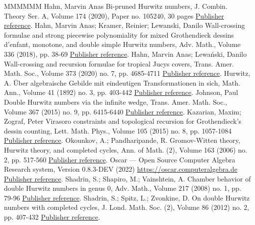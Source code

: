 \begin{thebibliography}{MMMMMM}
 Hahn, Marvin Anas Bi-pruned Hurwitz numbers, J. Combin. Theory Ser. A, Volume 174 (2020), Paper no. 105240, 30 pages \href{https://alco.centre-mersenne.org/articles/10.5802/alco.368/#hahn2020bi}{Publisher reference}.
 Hahn, Marvin Anas; Kramer, Reinier; Lewanski, Danilo Wall-crossing formulae and strong piecewise polynomiality for mixed Grothendieck dessins d’enfant, monotone, and double simple Hurwitz numbers, Adv. Math., Volume 336 (2018), pp. 38-69 \href{https://alco.centre-mersenne.org/articles/10.5802/alco.368/#hahn2018wall}{Publisher reference}.
 Hahn, Marvin Anas; Lewański, Danilo Wall-crossing and recursion formulae for tropical Jucys covers, Trans. Amer. Math. Soc., Volume 373 (2020) no. 7, pp. 4685-4711 \href{https://alco.centre-mersenne.org/articles/10.5802/alco.368/#hahn2020wall}{Publisher reference}.
 Hurwitz, A. Über algebraische Gebilde mit eindeutigen Transformationen in sich, Math. Ann., Volume 41 (1892) no. 3, pp. 403-442 \href{https://alco.centre-mersenne.org/articles/10.5802/alco.368/#hurwitz1892algebraische}{Publisher reference}.
 Johnson, Paul Double Hurwitz numbers via the infinite wedge, Trans. Amer. Math. Soc., Volume 367 (2015) no. 9, pp. 6415-6440 \href{https://alco.centre-mersenne.org/articles/10.5802/alco.368/#Joh15}{Publisher reference}.
 Kazarian, Maxim; Zograf, Peter Virasoro constraints and topological recursion for Grothendieck’s dessin counting, Lett. Math. Phys., Volume 105 (2015) no. 8, pp. 1057-1084 \href{https://alco.centre-mersenne.org/articles/10.5802/alco.368/#kazarian2015virasoro}{Publisher reference}.
 Okounkov, A.; Pandharipande, R. Gromov-Witten theory, Hurwitz theory, and completed cycles, Ann. of Math. (2), Volume 163 (2006) no. 2, pp. 517-560 \href{https://alco.centre-mersenne.org/articles/10.5802/alco.368/#okounkov2006gromov}{Publisher reference}.
 Oscar — Open Source Computer Algebra Research system, Version 0.8.3-DEV (2022) \url{https://oscar.computeralgebra.de} \href{https://alco.centre-mersenne.org/articles/10.5802/alco.368/#Oscar}{Publisher reference}.
 Shadrin, S.; Shapiro, M.; Vainshtein, A. Chamber behavior of double Hurwitz numbers in genus 0, Adv. Math., Volume 217 (2008) no. 1, pp. 79-96 \href{https://alco.centre-mersenne.org/articles/10.5802/alco.368/#SSV08}{Publisher reference}.
 Shadrin, S.; Spitz, L.; Zvonkine, D. On double Hurwitz numbers with completed cycles, J. Lond. Math. Soc. (2), Volume 86 (2012) no. 2, pp. 407-432 \href{https://alco.centre-mersenne.org/articles/10.5802/alco.368/#shadrin2012double}{Publisher reference}.
\end{thebibliography}
